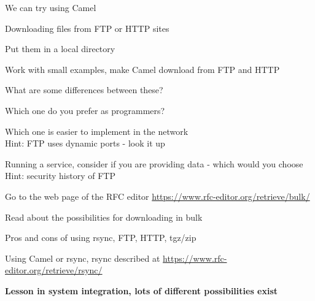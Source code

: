 \documentclass[Screen16to9,17pt]{foils}
\begin{document}
\begin{list2}
\item
\item
\end{list2}


\slide{}

\begin{list2}
\item
\item
\end{list2}



We can try using Camel
\begin{list2}
\item Downloading files from FTP or HTTP sites
\item Put them in a local directory
\item Work with small examples, make Camel download from FTP and HTTP
\end{list2}



\begin{list2}
\item What are some differences between these?
\item Which one do you prefer as programmers?
\item Which one is easier to implement in the network\\
Hint: FTP uses dynamic ports - look it up
\item Running a service, consider if you are providing data - which would you choose\\
Hint: security history of FTP
\end{list2}


\begin{list2}
\item Go to the web page of the RFC editor \url{https://www.rfc-editor.org/retrieve/bulk/}
\item Read about the possibilities for downloading in bulk
\item Pros and cons of using rsync, FTP, HTTP, tgz/zip
\item Using Camel or rsync, rsync described at \url{https://www.rfc-editor.org/retrieve/rsync/}
\end{list2}

\centerline{\bf Lesson in system integration, lots of different possibilities exist \smiley}


\slidenext
\end{document}
